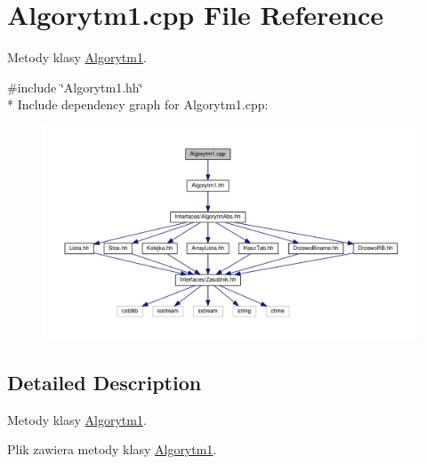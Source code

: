 \hypertarget{a00020}{}\section{Algorytm1.\+cpp File Reference}
\label{a00020}


Metody klasy \hyperlink{a00002}{Algorytm1}.  


{\ttfamily \#include \char`\"{}Algorytm1.\+hh\char`\"{}}\\*
Include dependency graph for Algorytm1.\+cpp\+:
\nopagebreak
\begin{figure}[H]
\begin{center}
\leavevmode
\includegraphics[width=350pt]{a00060}
\end{center}
\end{figure}


\subsection{Detailed Description}
Metody klasy \hyperlink{a00002}{Algorytm1}. 

Plik zawiera metody klasy \hyperlink{a00002}{Algorytm1}. 
